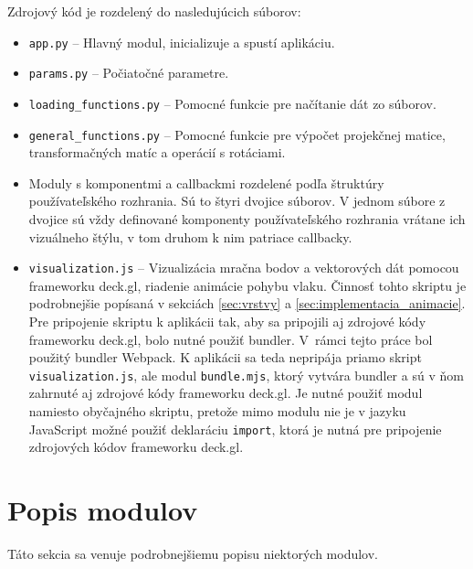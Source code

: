 Zdrojový kód je rozdelený do nasledujúcich súborov:
\begin{itemize}
    \item \texttt{app.py} -- Hlavný modul, inicializuje a spustí aplikáciu.
    \item \texttt{params.py} -- Počiatočné parametre.
    \item \texttt{loading\_functions.py} -- Pomocné funkcie pre načítanie dát zo súborov.
    \item \texttt{general\_functions.py} -- Pomocné funkcie pre výpočet projekčnej matice, transformačných matíc a operácií s rotáciami.
    \item Moduly s komponentmi a callbackmi rozdelené podľa štruktúry používateľského rozhrania. Sú to štyri dvojice súborov. V jednom súbore z dvojice sú vždy definované komponenty používateľského rozhrania vrátane ich vizuálneho štýlu, v tom druhom k nim patriace callbacky.
    \item \texttt{visualization.js} -- Vizualizácia mračna bodov a vektorových dát pomocou frameworku deck.gl, riadenie animácie pohybu vlaku. Činnosť tohto skriptu je podrobnejšie popísaná v sekciách \ref{sec:vrstvy} a \ref{sec:implementacia_animacie}. Pre pripojenie skriptu k aplikácii tak, aby sa pripojili aj zdrojové kódy frameworku deck.gl, bolo nutné použiť bundler. V~rámci tejto práce bol použitý bundler Webpack. K aplikácii sa teda nepripája priamo skript \texttt{visualization.js}, ale modul \texttt{bundle.mjs}, ktorý vytvára bundler a sú v ňom zahrnuté aj zdrojové kódy frameworku deck.gl. Je nutné použiť modul namiesto obyčajného skriptu, pretože mimo modulu nie je v jazyku JavaScript možné použiť deklaráciu \texttt{import}, ktorá je nutná pre pripojenie zdrojových kódov frameworku deck.gl. 
\end{itemize}

\section{Popis modulov}

Táto sekcia sa venuje podrobnejšiemu popisu niektorých modulov.

